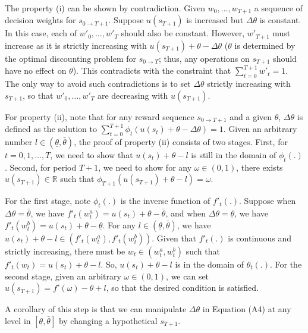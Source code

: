 \documentclass[
  12pt,
]{article}
\begin{document}
The property (i) can be shown by contradiction. Given \(w_0,…,w_{T+1}\)
a sequence of decision weights for \(s_{0\rightarrow T+1}\). Suppose
\(u(s_{T+1})\) is increased but \(\Delta \theta\) is constant. In this
case, each of \(w'_0,…,w'_T\) should also be constant. However,
\(w'_{T+1}\) must increase as it is strictly increasing with
\(u(s_{T+1})+\theta-\Delta \theta\) (\(\theta\) is determined by the
optimal discounting problem for \(s_{0\rightarrow T}\); thus, any
operations on \(s_{T+1}\) should have no effect on \(\theta\)). This
contradicts with the constraint that \(\sum_{t=0}^{T+1} w'_t =1\). The
only way to avoid such contradictions is to set \(\Delta \theta\)
strictly increasing with \(s_{T+1}\), so that \(w'_0,…,w'_T\) are
decreasing with \(u(s_{T+1})\).

For property (ii), note that for any reward sequence
\(s_{0\rightarrow T+1}\) and a given \(\theta\), \(\Delta\theta\) is
defined as the solution to
\(\sum_{t=0}^{T+1} \phi_t(u(s_t)+\theta-\Delta\theta)=1\). Given an
arbitrary number \(l\in(\underline{\theta},\bar{\theta})\), the proof of
property (ii) consists of two stages. First, for \(t=0,1,…,T\), we need
to show that \(u(s_t)+\theta-l\) is still in the domain of
\(\phi_t(.)\). Second, for period \(T+1\), we need to show for any
\(\omega\in(0,1)\), there exists \(u(s_{T+1})\in \mathbb{R}\) such that
\(\phi_{T+1}(u(s_{T+1})+\theta-l)=\omega\).

For the first stage, note \(\phi_t(.)\) is the inverse function of
\(f'_t(.)\). Suppose when \(\Delta\theta=\bar{\theta}\), we have
\(f'_t(w^{a}_t)=u(s_t)+\theta-\bar{\theta}\), and when
\(\Delta\theta=\underline{\theta}\), we have
\(f'_t(w^{b}_t)=u(s_t)+\theta-\underline{\theta}\). For any
\(l\in(\underline{\theta},\bar{\theta})\), we have
\(u(s_t)+\theta-l \in (f'_t(w^a_t),f'_t(w^b_t))\). Given that
\(f'_t(.)\) is continuous and strictly increasing, there must be
\(w_t\in(w^a_t,w^b_t)\) such that \(f'_t(w_t)=u(s_t)+\theta-l\). So,
\(u(s_t)+\theta-l\) is in the domain of \(\theta_t(.)\). For the second
stage, given an arbitrary \(\omega\in(0,1)\), we can set
\(u(s_{T+1})=f'(\omega)-\theta+l\), so that the desired condition is
satisfied.

A corollary of this step is that we can manipulate \(\Delta \theta\) in
Equation (A4) at any level in \([\underline{\theta},\bar{\theta}]\) by
changing a hypothetical \(s_{T+1}\).
\end{document}
